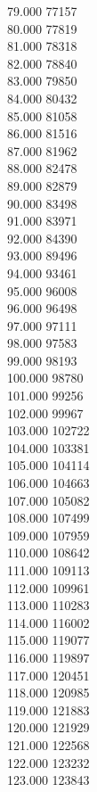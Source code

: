 { 79.000	77157 \\
 80.000	77819 \\
 81.000	78318 \\
 82.000	78840 \\
 83.000	79850 \\
 84.000	80432 \\
 85.000	81058 \\
 86.000	81516 \\
 87.000	81962 \\
 88.000	82478 \\
 89.000	82879 \\
 90.000	83498 \\
 91.000	83971 \\
 92.000	84390 \\
 93.000	89496 \\
 94.000	93461 \\
 95.000	96008 \\
 96.000	96498 \\
 97.000	97111 \\
 98.000	97583 \\
 99.000	98193 \\
 100.000	98780 \\
 101.000	99256 \\
 102.000	99967 \\
 103.000	102722 \\
 104.000	103381 \\
 105.000	104114 \\
 106.000	104663 \\
 107.000	105082 \\
 108.000	107499 \\
 109.000	107959 \\
 110.000	108642 \\
 111.000	109113 \\
 112.000	109961 \\
 113.000	110283 \\
 114.000	116002 \\
 115.000	119077 \\
 116.000	119897 \\
 117.000	120451 \\
 118.000	120985 \\
 119.000	121883 \\
 120.000	121929 \\
 121.000	122568 \\
 122.000	123232 \\
 123.000	123843 \\
}
